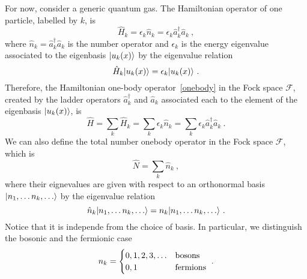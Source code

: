    For now, consider a generic quantum gas. The Hamiltonian operator of one particle, labelled by $k$, is 
    \begin{equation*}
        \hat H_k = \epsilon_k \hat n_k = \epsilon_k \hat a^\dagger_k \hat a_k ~,
    \end{equation*}
    where $\hat n_k = \hat a^\dagger_k \hat a_k$ is the number operator and $\epsilon_k$ is the energy eigenvalue associated to the eigenbasis $\vert u_k(x)\rangle$ by the eigenvalue relation
    \begin{equation*}
        \hat H_k \vert u_k(x)\rangle = \epsilon_k \vert u_k(x)\rangle ~.
    \end{equation*} 
    Therefore, the Hamiltonian one-body operator~\eqref{onebody} in the Fock space $\mathcal F$, created by the ladder operators $\hat a^\dagger_k$ and $\hat a_k$ associated each to the element of the eigenbasis $\vert u_k(x)\rangle$, is 
    \begin{equation}\label{opham}
        \hat H = \sum_k \hat H_k =  \sum_k \epsilon_k \hat n_k =  \sum_k \epsilon_k \hat a^\dagger_k \hat a_k ~.
    \end{equation}
    We can also define the total number onebody operator in the Fock space $\mathcal F$, which is 
    \begin{equation}\label{opnumb}
        \hat N = \sum_k \hat n_k ~,
    \end{equation}
    where their eignevalues are given with respect to an orthonormal basis $\vert n_1, \ldots n_k, \ldots\rangle$ by the eigenvalue relation
    \begin{equation*}
        \hat n_k \vert n_1, \ldots n_k, \ldots\rangle = n_k \vert n_1, \ldots n_k, \ldots\rangle ~.
    \end{equation*}
    Notice that it is independe from the choice of basis. In particular, we distinguish the bosonic and the fermionic case
    \begin{equation}\label{bosferm}
        n_k = \begin{cases}
            0,1,2,3,\ldots & \textnormal{bosons} \\
            0,1 & \textnormal{fermions} \\
        \end{cases} ~.
    \end{equation}

